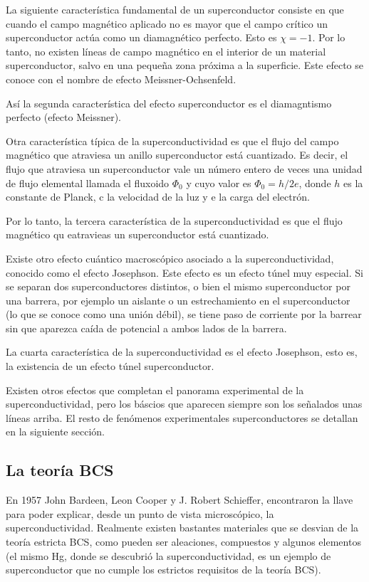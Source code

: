 La siguiente característica fundamental de un superconductor consiste en que cuando el campo magnético aplicado no es mayor que el campo  crítico un superconductor actúa como un diamagnético perfecto. Esto es $\chi = -1$. Por lo tanto, no existen líneas de campo magnético en el interior de un material superconductor, salvo en una pequeña zona próxima a la superficie. Este efecto se conoce con el nombre de efecto Meissner-Ochsenfeld.

Así la segunda característica del efecto superconductor es el diamagntismo perfecto (efecto Meissner).

Otra característica típica de la superconductividad es que el flujo del campo magnético que atraviesa un anillo superconductor está cuantizado. Es decir, el flujo que atraviesa un superconductor vale un número entero de veces una unidad de flujo elemental llamada el fluxoido $\Phi_0$ y cuyo valor es $\Phi_0 = h /2 e$, donde $h$ es la constante de Planck, c la velocidad de la luz y e la carga del electrón.

Por lo tanto, la tercera característica de la superconductividad es que el flujo magnético qu eatravieas un superconductor está cuantizado.

Existe otro efecto cuántico macroscópico asociado a la superconductividad, conocido como el efecto Josephson. Este efecto es un efecto túnel muy especial. Si se separan dos superconductores distintos, o bien el mismo superconductor por una barrera, por ejemplo un aislante o un estrechamiento en el superconductor (lo que se conoce como una unión débil), se tiene paso de corriente por la barrear sin que aparezca caída de potencial a ambos lados de la barrera.

La cuarta característica de la superconductividad es el efecto Josephson, esto es, la existencia de un efecto túnel superconductor.

Existen otros efectos que completan el panorama experimental de la superconductividad, pero los báscios que aparecen siempre son los señalados unas líneas arriba. El resto de fenómenos experimentales superconductores se detallan en la siguiente sección.

\subsection{La teoría BCS}

En 1957 John Bardeen, Leon Cooper y J. Robert Schieffer, encontraron la llave para poder explicar, desde un punto de vista microscópico, la superconductividad. Realmente existen bastantes materiales que se desvian de la teoría estricta BCS, como pueden ser aleaciones, compuestos y algunos elementos (el mismo Hg, donde se descubrió la superconductividad, es un ejemplo de superconductor que no cumple los estrictos requisitos de la teoría BCS).

